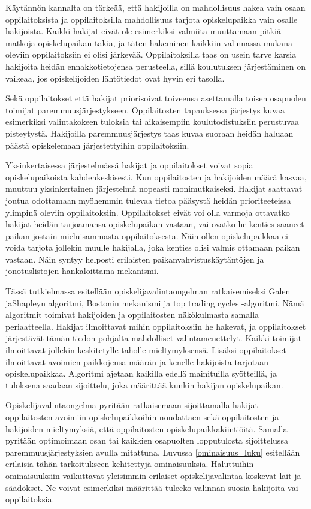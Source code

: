 \documentclass[twoside]{tktltiki}
\begin{document}
Käytännön kannalta on tärkeää, että hakijoilla on mahdollisuus hakea
vain osaan oppilaitoksista ja oppilaitoksilla mahdollisuus tarjota
opiskelupaikka vain osalle hakijoista. Kaikki hakijat eivät ole
esimerkiksi valmiita muuttamaan pitkiä matkoja opiskelupaikan takia,
ja täten hakeminen kaikkiin valinnassa mukana oleviin oppilaitoksiin
ei olisi järkevää. Oppilaitoksilla taas on usein tarve karsia
hakijoita heidän ennakkotietojensa perusteella, sillä koulutuksen
järjestäminen on vaikeaa, jos opiskelijoiden lähtötiedot ovat hyvin
eri tasolla.

Sekä oppilaitokset että hakijat priorisoivat toiveensa asettamalla
toisen osapuolen toimijat paremmuusjärjestykseen. Oppilaitosten
tapauksessa järjestys kuvaa esimerkiksi valintakokeen tuloksia tai
aikaisempiin koulutodistuksiin perustuvaa pisteytystä. Hakijoilla
paremmuusjärjestys taas kuvaa suoraan heidän haluaan päästä
opiskelemaan järjestettyihin oppilaitoksiin.

\enlargethispage{\baselineskip}
Yksinkertaisessa järjestelmässä hakijat ja oppilaitokset voivat sopia
opiskelupaikoista kahdenkeskisesti. Kun oppilaitosten ja hakijoiden
määrä kasvaa, muuttuu yksinkertainen järjestelmä nopeasti
monimutkaiseksi. Hakijat saattavat joutua odottamaan myöhemmin tulevaa
tietoa pääsystä heidän prioriteeteissa ylimpinä oleviin
oppilaitoksiin. Oppilaitokset eivät voi olla varmoja ottavatko hakijat
heidän tarjoamansa opiskelupaikan vastaan, vai ovatko he kenties
saaneet paikan jostain mieluisammasta oppilaitoksesta. Näin ollen
opiskelupaikkaa ei voida tarjota jollekin muulle hakijalla, joka
kenties olisi valmis ottamaan paikan vastaan. Näin syntyy helposti
erilaisten paikanvahvistuskäytäntöjen ja jonotuslistojen hankaloittama
mekanismi.

Tässä tutkielmassa esitellään opiskelijavalintaongelman
ratkaisemiseksi Galen ja\newline Shapleyn algoritmi, Bostonin
mekanismi ja top trading cycles -algoritmi. Nämä algoritmit toimivat
hakijoiden ja oppilaitosten näkökulmasta samalla periaatteella.
Hakijat ilmoittavat mihin oppilaitoksiin he hakevat, ja oppilaitokset
järjestävät tämän tiedon pohjalta mahdolliset valintamenettelyt.
Kaikki toimijat ilmoittavat jollekin keskitetylle taholle
mieltymyksensä. Lisäksi oppilaitokset ilmoittavat avoimien paikkojensa
määrän ja kenelle hakijoista tarjotaan opiskelupaikkaa. Algoritmi
ajetaan kaikilla edellä mainituilla syötteillä, ja tuloksena saadaan
sijoittelu, joka määrittää kunkin hakijan opiskelupaikan.

Opiskelijavalintaongelma pyritään ratkaisemaan sijoittamalla hakijat
oppilaitosten avoimiin opiskelupaikkoihin noudattaen sekä
oppilaitosten ja hakijoiden mieltymyksiä, että oppilaitosten
opiskelupaikkakiintiöitä. Samalla pyritään optimoimaan osan tai
kaikkien osapuolten lopputulosta sijoittelussa paremmuusjärjestyksien
avulla mitattuna. Luvussa \ref{ominaisuus_luku} esitellään erilaisia
tähän tarkoitukseen kehitettyjä ominaisuuksia. Haluttuihin
ominaisuuksiin vaikuttavat yleisimmin erilaiset opiskelijavalintaa
koskevat lait ja säädökset. Ne voivat esimerkiksi määrittää tuleeko
valinnan suosia hakijoita vai oppilaitoksia.
\end{document}
